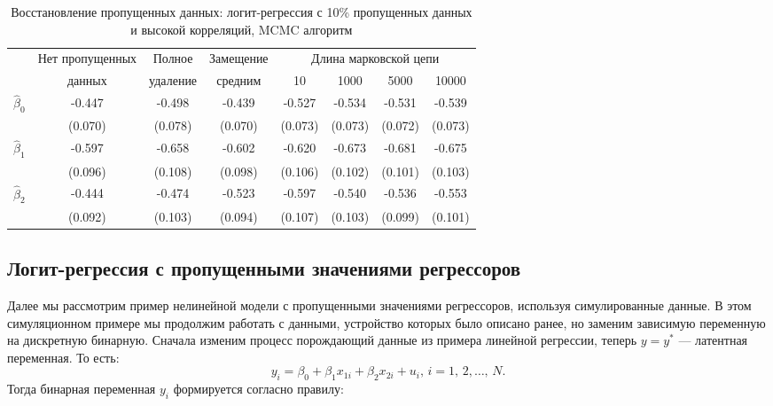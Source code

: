 \begin{table}[h]
\begin{center}
\caption{\label{tab:27.5} Восстановление пропущенных данных: логит-регрессия с 10\% пропущенных данных и высокой корреляций, MCMC алгоритм}
\begin{tabular}[t]{lccccccc}
\hline
\hline
 & Нет пропущенных & Полное & Замещение & \multicolumn{4}{c}{Длина марковской цепи} \\
 & данных & удаление & средним  & 10 & 1000 & 5000 & 10000 \\
\hline
$\hat{\beta}_0$  &  -0.447  & -0.498  & -0.439  & -0.527   &  -0.534   & -0.531  & -0.539   \\
                 &  (0.070) & (0.078) & (0.070) &  (0.073) &   (0.073) & (0.072) & (0.073)  \\
$\hat{\beta}_1$  &  -0.597  & -0.658  & -0.602  & -0.620   &  -0.673   & -0.681  & -0.675    \\
                 &  (0.096) & (0.108) & (0.098) &  (0.106) &   (0.102) & (0.101) & (0.103)  \\
$\hat{\beta}_2$  &  -0.444  & -0.474  & -0.523  & -0.597   &  -0.540   & -0.536  & -0.553   \\
                 &  (0.092) & (0.103) & (0.094) &  (0.107) &   (0.103) & (0.099) & (0.101)  \\
\hline
\hline
\end{tabular}
\end{center}
\end{table}







\subsection{Логит-регрессия с пропущенными значениями регрессоров} 
Далее мы рассмотрим пример нелинейной модели с пропущенными значениями регрессоров, используя симулированные данные. В этом симуляционном примере мы продолжим работать с данными, устройство которых было описано ранее, но заменим зависимую переменную на дискретную бинарную. Сначала изменим процесс порождающий данные из примера линейной регрессии, теперь $y=y^*$ --- латентная переменная. То есть:
\begin{equation}
y_i=\beta_0+\beta_1 x_{1i}+\beta_2 x_{2i}+u_i, \, i=1, \, 2, \dots , \, N.
\end{equation}
Тогда бинарная переменная $y_i$ формируется согласно  правилу:



